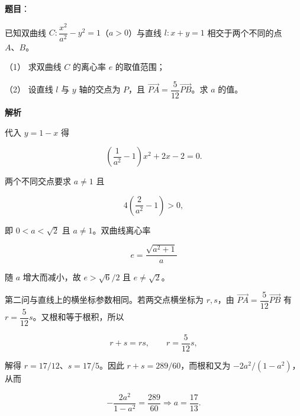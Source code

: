 \begin{answer}

\textbf{题目}：

已知双曲线 $C:\dfrac{x^2}{a^2}-y^2=1$（$a>0$）与直线 $l:x+y=1$ 相交于两个不同的点 $A\text{、}B$。

（1） 求双曲线 $C$ 的离心率 $e$ 的取值范围；

（2） 设直线 $l$ 与 $y$ 轴的交点为 $P$，且 $\overrightarrow{PA}=\dfrac5{12}\overrightarrow{PB}$。求 $a$ 的值。

\textbf{解析}


代入 $y=1-x$ 得

\nopagebreak[4]
\[
\left(\frac1{a^2}-1\right)x^2+2x-2=0.
\]

两个不同交点要求 $a\ne1$ 且

\nopagebreak[4]
\[
4\left(\frac2{a^2}-1\right)>0,
\]

即 $0<a<\sqrt2$ 且 $a\ne1$。双曲线离心率

\nopagebreak[4]
\[
e=\frac{\sqrt{a^2+1}}a
\]

随 $a$ 增大而减小，故 $e>\sqrt6/2$ 且 $e\ne\sqrt2$。


第二问与直线上的横坐标参数相同。若两交点横坐标为 $r,s$，由 $\overrightarrow{PA}=\dfrac5{12}\overrightarrow{PB}$ 有 $r=\dfrac5{12}s$。又根和等于根积，所以

\nopagebreak[4]
\[
r+s=rs,\qquad r=\frac5{12}s,
\]

解得 $r=17/12$、$s=17/5$。因此 $r+s=289/60$，而根和又为 $-2a^2/(1-a^2)$，从而

\nopagebreak[4]
\[
-\frac{2a^2}{1-a^2}=\frac{289}{60}
\Longrightarrow a=\frac{17}{13}.
\]



\end{answer}
